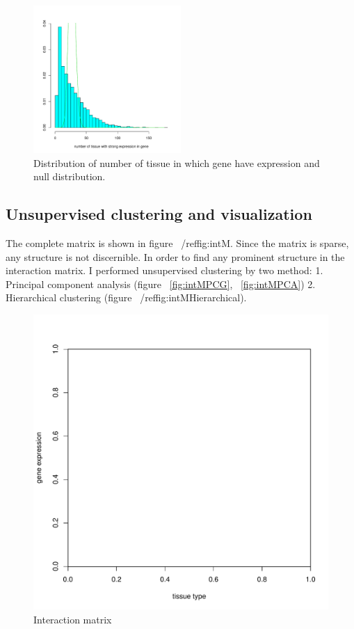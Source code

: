 \documentclass{article}
\begin{document}
\begin{figure}[ht]
	\begin{center}
		\includegraphics[width=0.5\textwidth]{weakExpressed.pdf}
	\end{center}
	\caption{ Distribution of number of tissue in which gene have expression and null distribution.}
	\label{fig:weakEx}
\end{figure}


\subsection{Unsupervised clustering and visualization}

The complete matrix is shown in 
figure ~/ref{fig:intM}. Since the matrix is sparse, any structure is not discernible. 
In order to find any prominent structure in the interaction matrix. I performed unsupervised clustering by two method: 1. Principal component
analysis (figure ~\ref{fig:intMPCG}, ~\ref{fig:intMPCA}) 2. Hierarchical clustering (figure ~/ref{fig:intMHierarchical}).

\begin{figure}[ht]
	\begin{center}
		\includegraphics[scale=0.7]{interactionMatrix.pdf}
	\end{center}
	\caption{Interaction matrix}
	\label{fig:intM}
\end{figure}
\end{document}
